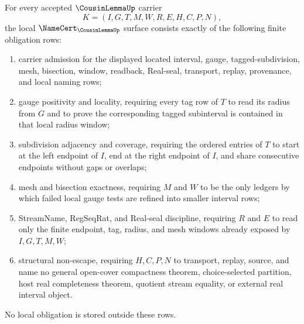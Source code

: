 \begin{theorem}
\label{thm:cousin-lemma-namecert-obligations}
For every accepted $\CousinLemmaUp$ carrier
$$
K=(I,G,T,M,W,R,E,H,C,P,N),
$$
the local $\NameCert_{\CousinLemmaUp}$ surface consists exactly of the following finite obligation rows:
\begin{enumerate}
\item carrier admission for the displayed located interval, gauge, tagged-subdivision, mesh, bisection, window, readback, Real-seal, transport, replay, provenance, and local naming rows;
\item gauge positivity and locality, requiring every tag row of $T$ to read its radius from $G$ and to prove the corresponding tagged subinterval is contained in that local radius window;
\item subdivision adjacency and coverage, requiring the ordered entries of $T$ to start at the left endpoint of $I$, end at the right endpoint of $I$, and share consecutive endpoints without gaps or overlaps;
\item mesh and bisection exactness, requiring $M$ and $W$ to be the only ledgers by which failed local gauge tests are refined into smaller interval rows;
\item StreamName, RegSeqRat, and Real-seal discipline, requiring $R$ and $E$ to read only the finite endpoint, tag, radius, and mesh windows already exposed by $I,G,T,M,W$;
\item structural non-escape, requiring $H,C,P,N$ to transport, replay, source, and name no general open-cover compactness theorem, choice-selected partition, host real completeness theorem, quotient stream equality, or external real interval object.
\end{enumerate}
No local obligation is stored outside these rows.
\end{theorem}

